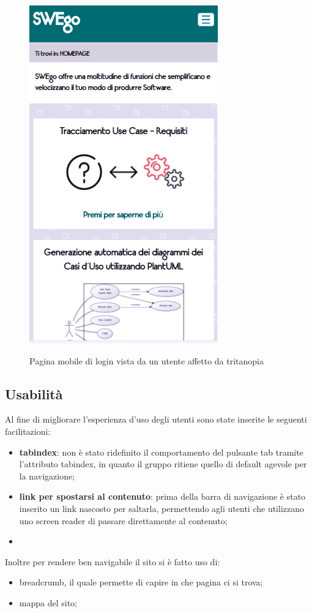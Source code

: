 	\begin{figure}
	\centering
		\includegraphics[scale=1]{img/tritanopia_mobile.png}\\[1cm] \caption{Pagina mobile di login vista da un utente affetto da tritanopia}
	\end{figure}
\subsection{Usabilità}
Al fine di migliorare l'esperienza d'uso degli utenti sono state inserite le seguenti facilitazioni:
\begin{itemize}
	\item \textbf{tabindex}: non è stato ridefinito il comportamento del pulsante tab tramite l'attributo tabindex, in quanto il gruppo ritiene quello di default agevole per la navigazione;
	\item \textbf{link per spostarsi al contenuto}: prima della barra di navigazione è stato inserito un link nascosto per saltarla, permettendo agli utenti che utilizzano uno screen reader di passare direttamente al contenuto;
	\item 
\end{itemize}
Inoltre per rendere ben navigabile il sito si è fatto uso di:
\begin{itemize}
	\item breadcrumb, il quale permette di capire in che pagina ci si trova;
	\item mappa del sito;
\end{itemize}
